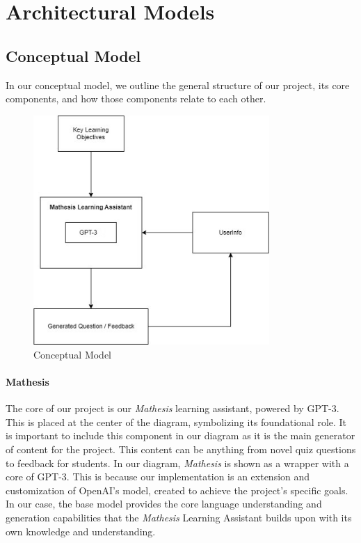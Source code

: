 \documentclass[12pt,a4paper]{article}
\begin{document}
    \section{Architectural Models}

    \subsection{Conceptual Model}
    
    In our conceptual model, we outline the general structure of our project, its core components,
    and how those components relate to each other.

    \begin{figure}[H]
        \centering
        \includegraphics[width=0.8\textwidth]{images/conceptualDiagram}
        \caption{Conceptual Model}
        \label{fig:conceptualModel}
    \end{figure}
    

    \paragraph{Mathesis}
    The core of our project is our \textit{Mathesis}
    learning assistant, powered by GPT-3.  This is placed at the center of the diagram, symbolizing
    its foundational role. It is important to include this component in our diagram as it is the main
    generator of content for the project.  This content can be anything from novel quiz questions to
    feedback for students. In our diagram, \textit{Mathesis} is shown as a wrapper with a core of
    GPT-3.  This is because our implementation is an extension and customization of OpenAI's model, created
    to achieve the project's specific goals. In our case, the base model provides the core language
    understanding and generation capabilities that the \textit{Mathesis} Learning Assistant builds
    upon with its own knowledge and understanding.
\end{document}
